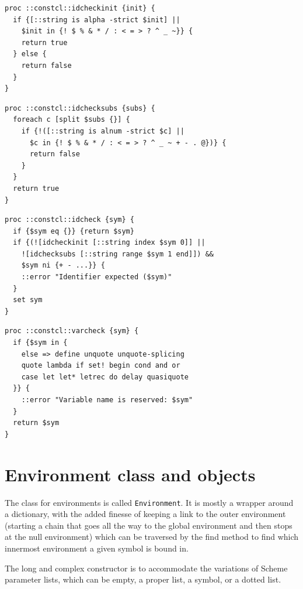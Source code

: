 \documentclass[twoside,9pt]{report}
\begin{document}
\begin{lstlisting}
proc ::constcl::idcheckinit {init} {
  if {[::string is alpha -strict $init] ||
    $init in {! $ % & * / : < = > ? ^ _ ~}} {
    return true
  } else {
    return false
  }
}
\end{lstlisting}
\begin{lstlisting}
proc ::constcl::idchecksubs {subs} {
  foreach c [split $subs {}] {
    if {!([::string is alnum -strict $c] ||
      $c in {! $ % & * / : < = > ? ^ _ ~ + - . @})} {
      return false
    }
  }
  return true
}
\end{lstlisting}
\begin{lstlisting}
proc ::constcl::idcheck {sym} {
  if {$sym eq {}} {return $sym}
  if {(![idcheckinit [::string index $sym 0]] ||
    ![idchecksubs [::string range $sym 1 end]]) &&
    $sym ni {+ - ...}} {
    ::error "Identifier expected ($sym)"
  }
  set sym
}
\end{lstlisting}
\begin{lstlisting}
proc ::constcl::varcheck {sym} {
  if {$sym in {
    else => define unquote unquote-splicing
    quote lambda if set! begin cond and or
    case let let* letrec do delay quasiquote
  }} {
    ::error "Variable name is reserved: $sym"
  }
  return $sym
}
\end{lstlisting}
\chapter{Environment class and objects}
\label{environment-class-and-objects}


The class for environments is called \texttt{Environment}. It is mostly a wrapper around a dictionary, with the added finesse of keeping a link to the outer environment (starting a chain that goes all the way to the global environment and then stops at the null environment) which can be traversed by the find method to find which innermost environment a given symbol is bound in.


The long and complex constructor is to accommodate the variations of Scheme parameter lists, which can be empty, a proper list, a symbol, or a dotted list.
\end{document}
